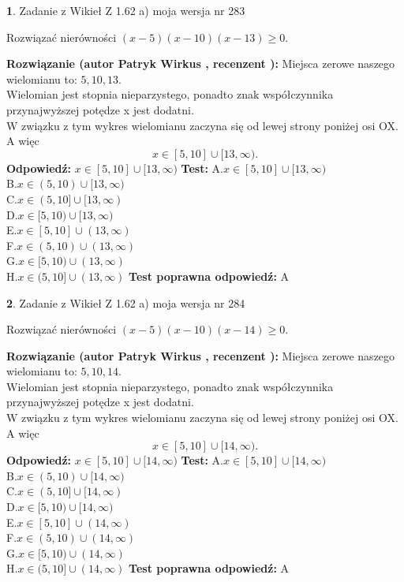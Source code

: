 \documentclass[12pt, a4paper]{article}
\theoremstyle{definition} %
\newtheorem{zad}{}
\newcommand{\zadStart}[1]{\begin{zad}#1\newline}
\newcommand{\zadStop}{\end{zad}}
\newcommand{\rozwStart}[2]{\noindent \textbf{Rozwiązanie (autor #1 , recenzent #2): }\newline}
\newcommand{\rozwStop}{\newline}
\newcommand{\odpStart}{\noindent \textbf{Odpowiedź:}\newline}
\newcommand{\odpStop}{\newline}
\newcommand{\testStart}{\noindent \textbf{Test:}\newline}
\newcommand{\testStop}{\newline}
\newcommand{\kluczStart}{\noindent \textbf{Test poprawna odpowiedź:}\newline}
\newcommand{\kluczStop}{\newline}
\begin{document}
\zadStart{Zadanie z Wikieł Z 1.62 a) moja wersja nr 283}

Rozwiązać nierówności $(x-5)(x-10)(x-13)\ge0$.
\zadStop
\rozwStart{Patryk Wirkus}{}
Miejsca zerowe naszego wielomianu to: $5, 10, 13$.\\
Wielomian jest stopnia nieparzystego, ponadto znak współczynnika przy\linebreak najwyższej potędze x jest dodatni.\\ W związku z tym wykres wielomianu zaczyna się od lewej strony poniżej osi OX. A więc $$x \in [5,10] \cup [13,\infty).$$
\rozwStop
\odpStart
$x \in [5,10] \cup [13,\infty)$
\odpStop
\testStart
A.$x \in [5,10] \cup [13,\infty)$\\
B.$x \in (5,10) \cup [13,\infty)$\\
C.$x \in (5,10] \cup [13,\infty)$\\
D.$x \in [5,10) \cup [13,\infty)$\\
E.$x \in [5,10] \cup (13,\infty)$\\
F.$x \in (5,10) \cup (13,\infty)$\\
G.$x \in [5,10) \cup (13,\infty)$\\
H.$x \in (5,10] \cup (13,\infty)$
\testStop
\kluczStart
A
\kluczStop



\zadStart{Zadanie z Wikieł Z 1.62 a) moja wersja nr 284}

Rozwiązać nierówności $(x-5)(x-10)(x-14)\ge0$.
\zadStop
\rozwStart{Patryk Wirkus}{}
Miejsca zerowe naszego wielomianu to: $5, 10, 14$.\\
Wielomian jest stopnia nieparzystego, ponadto znak współczynnika przy\linebreak najwyższej potędze x jest dodatni.\\ W związku z tym wykres wielomianu zaczyna się od lewej strony poniżej osi OX. A więc $$x \in [5,10] \cup [14,\infty).$$
\rozwStop
\odpStart
$x \in [5,10] \cup [14,\infty)$
\odpStop
\testStart
A.$x \in [5,10] \cup [14,\infty)$\\
B.$x \in (5,10) \cup [14,\infty)$\\
C.$x \in (5,10] \cup [14,\infty)$\\
D.$x \in [5,10) \cup [14,\infty)$\\
E.$x \in [5,10] \cup (14,\infty)$\\
F.$x \in (5,10) \cup (14,\infty)$\\
G.$x \in [5,10) \cup (14,\infty)$\\
H.$x \in (5,10] \cup (14,\infty)$
\testStop
\kluczStart
A
\kluczStop
\end{document}
